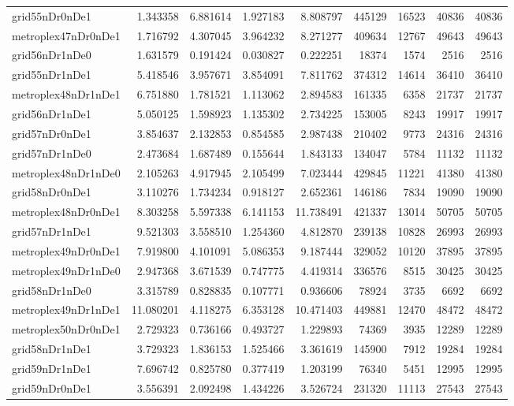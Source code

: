 \begin{longtable}{|l|r|r|r|r|r|r|r|r|}
grid55nDr0nDe1 & 1.343358 & 6.881614 & 1.927183 & 8.808797 & 445129 & 16523 & 40836 & 40836 \\
metroplex47nDr0nDe1 & 1.716792 & 4.307045 & 3.964232 & 8.271277 & 409634 & 12767 & 49643 & 49643 \\
grid56nDr1nDe0 & 1.631579 & 0.191424 & 0.030827 & 0.222251 & 18374 & 1574 & 2516 & 2516 \\
grid55nDr1nDe1 & 5.418546 & 3.957671 & 3.854091 & 7.811762 & 374312 & 14614 & 36410 & 36410 \\
metroplex48nDr1nDe1 & 6.751880 & 1.781521 & 1.113062 & 2.894583 & 161335 & 6358 & 21737 & 21737 \\
grid56nDr1nDe1 & 5.050125 & 1.598923 & 1.135302 & 2.734225 & 153005 & 8243 & 19917 & 19917 \\
grid57nDr0nDe1 & 3.854637 & 2.132853 & 0.854585 & 2.987438 & 210402 & 9773 & 24316 & 24316 \\
grid57nDr1nDe0 & 2.473684 & 1.687489 & 0.155644 & 1.843133 & 134047 & 5784 & 11132 & 11132 \\
metroplex48nDr1nDe0 & 2.105263 & 4.917945 & 2.105499 & 7.023444 & 429845 & 11221 & 41380 & 41380 \\
grid58nDr0nDe1 & 3.110276 & 1.734234 & 0.918127 & 2.652361 & 146186 & 7834 & 19090 & 19090 \\
metroplex48nDr0nDe1 & 8.303258 & 5.597338 & 6.141153 & 11.738491 & 421337 & 13014 & 50705 & 50705 \\
grid57nDr1nDe1 & 9.521303 & 3.558510 & 1.254360 & 4.812870 & 239138 & 10828 & 26993 & 26993 \\
metroplex49nDr0nDe1 & 7.919800 & 4.101091 & 5.086353 & 9.187444 & 329052 & 10120 & 37895 & 37895 \\
metroplex49nDr1nDe0 & 2.947368 & 3.671539 & 0.747775 & 4.419314 & 336576 & 8515 & 30425 & 30425 \\
grid58nDr1nDe0 & 3.315789 & 0.828835 & 0.107771 & 0.936606 & 78924 & 3735 & 6692 & 6692 \\
metroplex49nDr1nDe1 & 11.080201 & 4.118275 & 6.353128 & 10.471403 & 449881 & 12470 & 48472 & 48472 \\
metroplex50nDr0nDe1 & 2.729323 & 0.736166 & 0.493727 & 1.229893 & 74369 & 3935 & 12289 & 12289 \\
grid58nDr1nDe1 & 3.729323 & 1.836153 & 1.525466 & 3.361619 & 145900 & 7912 & 19284 & 19284 \\
grid59nDr1nDe1 & 7.696742 & 0.825780 & 0.377419 & 1.203199 & 76340 & 5451 & 12995 & 12995 \\
grid59nDr0nDe1 & 3.556391 & 2.092498 & 1.434226 & 3.526724 & 231320 & 11113 & 27543 & 27543 \\

\end{longtable}
